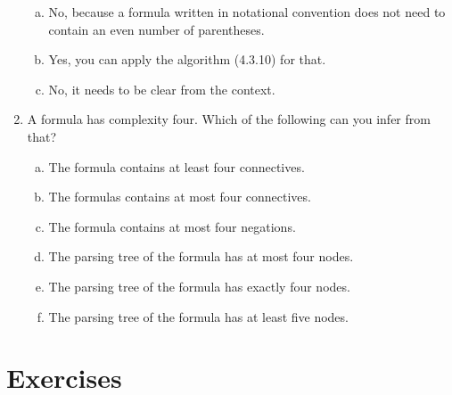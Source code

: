 \begin{enumerate}[\thesection.1]
\begin{enumerate}[(a)]
		\item No, because a formula written in notational convention does  not need to contain an even number of parentheses.
	
		\item Yes, you can apply the algorithm (4.3.10) for that.
	
		\item No, it needs to be clear from the context.
	
	\end{enumerate}
	
	\item A formula has complexity four. Which of the following can you infer from that?
		
		\begin{enumerate}[(a)]
		
			\item The formula contains at least four connectives.
			
			\item The formulas contains at most four connectives.
			
			\item The formula contains at most four negations.
			
			\item The parsing tree of the formula has at most four nodes.

			\item The parsing tree of the formula has exactly four nodes.
			
			\item The parsing tree of the formula has at least five nodes.
		
		\end{enumerate}

	\end{enumerate}
\section{Exercises}


